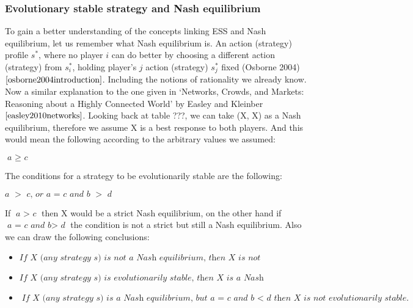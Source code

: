 \documentclass{article}
\begin{document}
\subsubsection{Evolutionary stable strategy and Nash equilibrium}
To gain a better understanding of the concepts linking ESS and Nash equilibrium, let us remember what Nash equilibrium is. 
An action (strategy) profile $s^*$, where no player $\textit{i}$ can do better by choosing a different action (strategy) from $s^*_i$, holding player’s $\textit{j}$ action (strategy) $s^*_{j}$ fixed (Osborne 2004)$\cite{osborne2004introduction}$.  Including the notions of rationality we already know.   
Now a similar explanation to the one given in ‘Networks, Crowds, and Markets: Reasoning about a Highly Connected World’ by Easley and Kleinber$\cite{easley2010networks}$.
Looking back at table ???, we can take (X, X) as a Nash equilibrium, therefore we assume X is a best response to both players. And this would mean the following according to the arbitrary values we assumed:
\begin{center}
$\textit{a $\geq$ c}$
\end{center}
The conditions for a strategy to be evolutionarily stable are the following:
\begin{center}
$\textit{a $>$ c, or a = c and b $>$ d}$
\end{center}
If $\textit{a $>$ c}$ then X would be a strict Nash equilibrium, on the other hand if $\textit{a = c and b$>$ d}$ the condition is not a strict but still a Nash equilibrium. Also we can draw the following conclusions:

\begin{itemize}
\item $\textit{If X (any strategy s) is not a Nash equilibrium, then X is not evolutionarily stable.}$ 
\item $\textit{If X (any strategy s) is evolutionarily stable, then X is a Nash equilibrium.}$ 
\item $\textit{If X (any strategy s) is a Nash equilibrium, but  $\textit{a = c and b $<$ d}$ then X is not evolutionarily stable.}$
\end{itemize}
\end{document}
